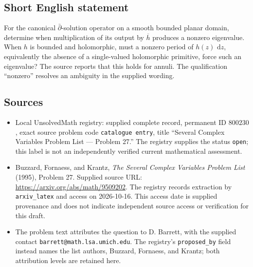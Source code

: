 \documentclass[11pt]{article}
\newcommand{\dd}{\,\mathrm{d}}
\begin{document}
\subsection{Short English statement}
For the canonical \(\bar\partial\)-solution operator on a smooth bounded planar domain, determine when multiplication of its output by \(\overline h\) produces a nonzero eigenvalue. When \(h\) is bounded and holomorphic, must a nonzero period of \(h(z)\,\dd z\), equivalently the absence of a single-valued holomorphic primitive, force such an eigenvalue? The source reports that this holds for annuli. The qualification ``nonzero'' resolves an ambiguity in the supplied wording.
\subsection{Sources}
\begin{itemize}
\item Local UnsolvedMath registry: supplied complete record, permanent ID \(800230\), exact source problem code \texttt{catalogue entry}, title ``Several Complex Variables Problem List --- Problem 27.'' The registry supplies the status \texttt{open}; this label is not an independently verified current mathematical assessment.
\item Buzzard, Fornaess, and Krantz, \emph{The Several Complex Variables Problem List} (1995), Problem 27. Supplied source URL: \url{https://arxiv.org/abs/math/9509202}. The registry records extraction by \texttt{arxiv\_latex} and access on 2026-10-16. This access date is supplied provenance and does not indicate independent source access or verification for this draft.
\item The problem text attributes the question to D. Barrett, with the supplied contact \texttt{barrett@math.lsa.umich.edu}. The registry's \texttt{proposed\_by} field instead names the list authors, Buzzard, Fornaess, and Krantz; both attribution levels are retained here.
\end{itemize}
\end{document}
